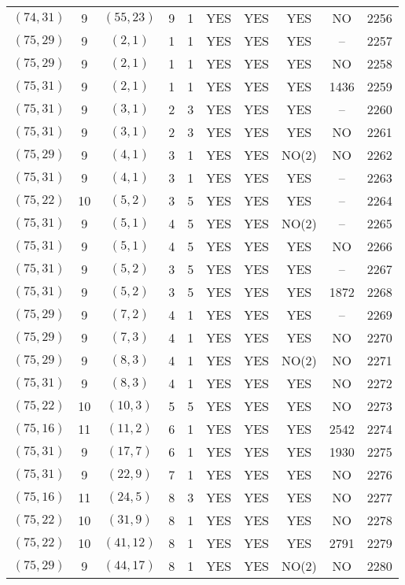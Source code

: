 \begin{longtable}{|c|c|c|c|c|c|c|c|c|c|}
$(74, 31)$ & 9 & $(55, 23)$ & 9 & 1 & YES & YES & YES & NO & 2256\\
$(75, 29)$ & 9 & $(2, 1)$ & 1 & 1 & YES & YES & YES & -- & 2257\\
$(75, 29)$ & 9 & $(2, 1)$ & 1 & 1 & YES & YES & YES & NO & 2258\\
$(75, 31)$ & 9 & $(2, 1)$ & 1 & 1 & YES & YES & YES & 1436 & 2259\\
$(75, 31)$ & 9 & $(3, 1)$ & 2 & 3 & YES & YES & YES & -- & 2260\\
$(75, 31)$ & 9 & $(3, 1)$ & 2 & 3 & YES & YES & YES & NO & 2261\\
$(75, 29)$ & 9 & $(4, 1)$ & 3 & 1 & YES & YES & NO(2) & NO & 2262\\
$(75, 31)$ & 9 & $(4, 1)$ & 3 & 1 & YES & YES & YES & -- & 2263\\
$(75, 22)$ & 10 & $(5, 2)$ & 3 & 5 & YES & YES & YES & -- & 2264\\
$(75, 31)$ & 9 & $(5, 1)$ & 4 & 5 & YES & YES & NO(2) & -- & 2265\\
$(75, 31)$ & 9 & $(5, 1)$ & 4 & 5 & YES & YES & YES & NO & 2266\\
$(75, 31)$ & 9 & $(5, 2)$ & 3 & 5 & YES & YES & YES & -- & 2267\\
$(75, 31)$ & 9 & $(5, 2)$ & 3 & 5 & YES & YES & YES & 1872 & 2268\\
$(75, 29)$ & 9 & $(7, 2)$ & 4 & 1 & YES & YES & YES & -- & 2269\\
$(75, 29)$ & 9 & $(7, 3)$ & 4 & 1 & YES & YES & YES & NO & 2270\\
$(75, 29)$ & 9 & $(8, 3)$ & 4 & 1 & YES & YES & NO(2) & NO & 2271\\
$(75, 31)$ & 9 & $(8, 3)$ & 4 & 1 & YES & YES & YES & NO & 2272\\
$(75, 22)$ & 10 & $(10, 3)$ & 5 & 5 & YES & YES & YES & NO & 2273\\
$(75, 16)$ & 11 & $(11, 2)$ & 6 & 1 & YES & YES & YES & 2542 & 2274\\
$(75, 31)$ & 9 & $(17, 7)$ & 6 & 1 & YES & YES & YES & 1930 & 2275\\
$(75, 31)$ & 9 & $(22, 9)$ & 7 & 1 & YES & YES & YES & NO & 2276\\
$(75, 16)$ & 11 & $(24, 5)$ & 8 & 3 & YES & YES & YES & NO & 2277\\
$(75, 22)$ & 10 & $(31, 9)$ & 8 & 1 & YES & YES & YES & NO & 2278\\
$(75, 22)$ & 10 & $(41, 12)$ & 8 & 1 & YES & YES & YES & 2791 & 2279\\
$(75, 29)$ & 9 & $(44, 17)$ & 8 & 1 & YES & YES & NO(2) & NO & 2280\\

\end{longtable}
